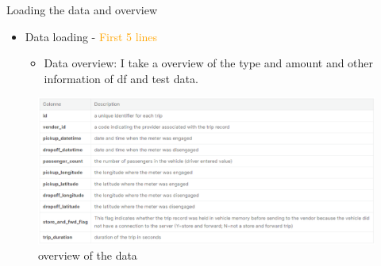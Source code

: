 \documentclass[
 size=14pt,
 paper=smartboard,  %
 mode=present, 		%
 display=slides, 	%
 style=tuliplab,  	%
 pauseslide,
 fleqn,leqno]{powerdot}
\begin{document}
\begin{slide}{Loading the data and overview}
\begin{itemize}
\item
Data loading - \textcolor{orange}{First 5 lines}

\begin{itemize}
\item
Data overview: I take a overview of the type and amount and other information of df and test data.
\end{itemize}
\vspace{0.5cm}
%
%
%
\end{itemize}
\centering
\begin{figure}
\includegraphics[scale=0.3]{overview.eps}
{\caption{overview of the data}}
\end{figure}
\end{slide}
\end{document}
